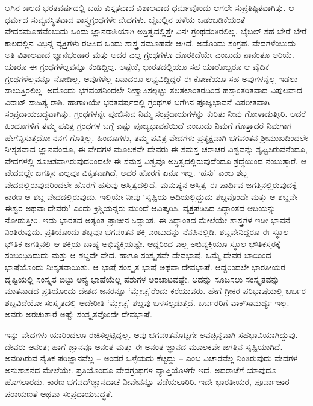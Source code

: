 ಆಗಿನ ಕಾಲದ ಭರತವರ್ಷದಲ್ಲಿ ಬಹು ವಿಸ್ತೃತವಾದ ವಿಶಾಲವಾದ ಧರ್ಮವೊಂದು ಆಗಲೇ ಸುಪ್ರತಿಷ್ಠಿತವಾಗಿತ್ತು. ಆ ಧರ್ಮದ ಸುವ್ಯವಸ್ಥಿತವಾದ ಶಾಸ್ತ್ರಗ್ರಂಥಗಳೇ ವೇದಗಳು. ಬೈಬಲ್ಲಿನ ಹಳೆಯ ಒಡಂಬಡಿಕೆಯಂತೆ ವೇದಸಮೂಹವೆಂಬುದು ಒಂದು ಜ್ಞಾನರಾಶಿಯಾಗಿ ಅಸ್ತಿತ್ವದಲ್ಲಿತ್ತೇ ವಿನಃ ಗ್ರಂಥದಂತಿರಲಿಲ್ಲ. ಬೈಬಲ್ ಸಹ ಬೇರೆ ಬೇರೆ ಕಾಲದಲ್ಲಿನ ವಿಭಿನ್ನ ವ್ಯಕ್ತಿಗಳು ರಚಿಸಿದ ಒಂದು ಶಾಸ್ತ್ರ ಸಮೂಹವೇ ಆಗಿದೆ. ಅದೊಂದು ಸಂಗ್ರಹ. ವೇದಗಳೆಂಬುದು ಅತಿ ವಿಶಾಲವಾದ ಜ್ಞಾನಭಂಡಾರ ಮತ್ತು ಅದರ ಎಲ್ಲ ಗ್ರಂಥಗಳೂ ದೊರಕಿದೆಯೇ ಎಂಬುದು ನಾನಂತೂ ಅರಿಯೆ. ಯಾರೂ ಈ ಗ್ರಂಥಗಳೆಲ್ಲವನ್ನೂ ಕಂಡಿದ್ದಿಲ್ಲ. ಅಷ್ಟೇಕೆ, ಭಾರತದಲ್ಲಿಯೂ ಸಹ ಯಾರೊಬ್ಬರೂ ಆ ವೈದಿಕ ಗ್ರಂಥಗಳೆಲ್ಲವನ್ನೂ ನೋಡಿಲ್ಲ. ಅವುಗಳೆಲ್ಲ ಏನಾದರೂ ಲಭ್ಯವಿದ್ದಿದ್ದರೆ ಈ ಕೋಣೆಯೂ ಸಹ ಅವುಗಳನ್ನೆಲ್ಲ ಇಡಲು ಸಾಲುತ್ತಿರಲಿಲ್ಲ. ಅದೊಂದು ಭಗವಂತನಿಂದಲೇ ನಿಃಶ್ವಾಸಿಸಲ್ಪಟ್ಟು ತಲತಲಾಂತರದಿಂದ ಹಸ್ತಾಂತರಿತವಾದ ವಿಪುಲವಾದ ವಿರಾಟ್ ಸಾಹಿತ್ಯ ರಾಶಿ. ಹಾಗಾಗಿಯೇ ಭರತವರ್ಷದಲ್ಲಿ ಗ್ರಂಥಗಳ ಬಗೆಗಿನ ಪೂಜ್ಯಭಾವನೆ ವಿಪರೀತವಾಗಿ ಸಂಪ್ರದಾಯಬದ್ಧವಾಗಿತ್ತು. ಗ್ರಂಥಗಳನ್ನೇ ಪೂಜಿಸುವ ನಿಮ್ಮ ಸಂಪ್ರದಾಯಗಳನ್ನು ಕುರಿತು ನೀವು ಗೋಳಾಡುತ್ತೀರಿ. ಆದರೆ ಹಿಂದೂಗಳಿಗೆ ತಮ್ಮ ಪವಿತ್ರ ಗ್ರಂಥಗಳ ಬಗ್ಗೆ ಎಷ್ಟು ಪೂಜ್ಯಭಾವನೆಯಿದೆ ಎಂಬುದು ನಿಮಗೆ ಗೊತ್ತಾದರೆ ನಿಮಗಾಗ ಹೇಗೆನ್ನಿಸುತ್ತದೋ ನನಗೆ ಗೊತ್ತಿಲ್ಲ. ಹಿಂದೂಗಳು, ತಮ್ಮ ಪವಿತ್ರ ವೇದಗಳು ಪ್ರತ್ಯಕ್ಷವಾಗಿ ಭಗವಂತನ ಶ‍್ರೀಮುಖದಿಂದಲೇ ನಿಃಸೃತವಾದ ಜ್ಞಾನವೆಂದೂ, ಈ ವೇದಗಳ ಮೂಲಕವೇ ದೇವರು ಈ ಸಮಸ್ತ ಚರಾಚರ ವಿಶ್ವವನ್ನು ಸೃಷ್ಟಿಸಿರುವನೆಂದೂ, ವೇದಗಳಲ್ಲಿ ಸೂಚಿತವಾಗಿರುವುದರಿಂದಲೇ ಈ ಸಮಸ್ತ ವಿಶ್ವವೂ ಅಸ್ತಿತ್ವದಲ್ಲಿರುವುದೆಂದೂ ಶ್ರದ್ಧೆಯಿಂದ ನಂಬುತ್ತಾರೆ. ಆ ವೇದದಲ್ಲೇ ಜಗತ್ತಿನ ಎಲ್ಲವೂ ವಿಕೃತವಾಗಿದೆ, ಅದರ ಹೊರಗೆ ಏನೂ ಇಲ್ಲ. ‘ಹಸು’ ಎಂಬ ಶಬ್ದ ವೇದದಲ್ಲಿರುವುದರಿಂದಲೇ ಹೊರಗೆ ಹಸುವು ಅಸ್ತಿತ್ವದಲ್ಲಿದೆ. ಮನುಷ್ಯನ ಅಸ್ತಿತ್ವ ಈ ಪಾರ್ಥಿವ ಜಗತ್ತಿನಲ್ಲಿರುವುದಕ್ಕೆ ಕಾರಣ ಆ ಶಬ್ದ ವೇದದಲ್ಲಿರುವುದು. ಇಲ್ಲಿಯೇ ನೀವು ‘ಸೃಷ್ಟಿಯ ಆದಿಯಲ್ಲಿದ್ದುದು ಶಬ್ದವೊಂದೇ ಮತ್ತು ಆ ಶಬ್ದವೇ ಈಶ್ವರ ಅಥವಾ ದೇವರು’ ಎಂದು ಕ್ರಿಶ್ಚಿಯನ್ನರು ಮುಂದೆ ಆವಿಷ್ಕರಿಸಿ, ವ್ಯಕ್ತಪಡಿಸಿದ ಸಿದ್ಧಾಂತದ ಆದಿಯನ್ನು ನೋಡುತ್ತೀರಿ. ಇದು ಭಾರತದ ಅತ್ಯಂತ ಪ್ರಾಚೀನ ಸಿದ್ಧಾಂತ. ಈ ಸಿದ್ಧಾಂತದ ಮೇಲೆಯೇ ಶಾಸ್ತ್ರಗಳ ಇಡೀ ಭಾವನೆ ನಿಂತಿರುವುದು. ಪ್ರತಿಯೊಂದು ಶಬ್ದವೂ ಭಗವಂತನ ಶಕ್ತಿ ಎಂಬುದನ್ನು ನೆನಪಿನಲ್ಲಿಡಿ. ಶಬ್ದವೇನಿದ್ದರೂ ಈ ಸ್ಥೂಲ ಭೌತಿಕ ಜಗತ್ತಿನಲ್ಲಿ ಆ ಶಕ್ತಿಯ ಬಾಹ್ಯ ಅಭಿವ್ಯಕ್ತಿಯಷ್ಟೇ. ಆದ್ದರಿಂದ ಎಲ್ಲ ಅಭಿವ್ಯಕ್ತಿಯೂ ಸ್ಥೂಲ ಭೌತಿಕಸ್ತರಕ್ಕೆ ಸಂಬಂಧಿಸಿದುದು ಮತ್ತು ಆ ಶಬ್ದವೇ ವೇದ. ಹಾಗೂ ಸಂಸ್ಕೃತವೇ ದೇವಭಾಷೆ. ಒಮ್ಮೆ ದೇವರ ಬಾಯಿಂದ ಭಾಷೆಯೊಂದು ನಿಃಸೃತವಾಯಿತು. ಆ ಭಾಷೆ ಸಂಸ್ಕೃತ ಭಾಷೆ ಅಥವಾ ದೇವಭಾಷೆ. ಆದ್ದರಿಂದಲೇ ಭಾರತೀಯರ ದೃಷ್ಟಿಯಲ್ಲಿ ಸಂಸ್ಕೃತ ಬಿಟ್ಟು ಅನ್ಯ ಭಾಷೆಯೆಲ್ಲ ಪಶುಗಳ ಅರಚಾಟವಷ್ಟೇ. ಅದನ್ನು ಸೂಚಿಸಲು ಸಂಸ್ಕೃತವನ್ನು ಮಾತನಾಡದ ಪ್ರತಿಯೊಂದು ದೇಶದ ಜನರನ್ನೂ ‘ಮ್ಲೇಚ್ಛ’ರೆಂದು ಕರೆಯುವರು. ಹೇಗೆ ಗ್ರೀಕರ ಪರಿಭಾಷೆಯಲ್ಲಿ ಬರ್ಬರ ಶಬ್ದವಿದೆಯೋ ಸಂಸ್ಕೃತದಲ್ಲಿ ಅದೇರೀತಿ ‘ಮ್ಲೇಚ್ಛ’ ಶಬ್ದವು ಬಳಸಲ್ಪಡುತ್ತದೆ. ಬರ್ಬರರಿಗೆ ವಾಕ್‌ಸಾಮರ್ಥ್ಯ ಇಲ್ಲ. ಅವರು ಅರಚುತ್ತಾರೆ ಅಷ್ಟೆ; ಸಂಸ್ಕೃತವೊಂದೇ ದೇವಭಾಷೆ.

ಇನ್ನು ವೇದಗಳು ಯಾರಿಂದಲೂ ರಚಿಸಲ್ಪಟ್ಟಿದ್ದಲ್ಲ. ಅವು ಭಗವಂತನೊಟ್ಟಿಗೇ ಅವಚ್ಛಿನ್ನವಾಗಿ ಸಹಭಾವಿಯಾಗಿದ್ದುವು. ದೇವರು ಅನಂತ; ಹಾಗೆ ಜ್ಞಾನವೂ ಅನಂತ ಮತ್ತು ಈ ಅನಂತ ಜ್ಞಾನದ ಮೂಲಕವೇ ಜಗತ್ತಿನ ಸೃಷ್ಟಿಯಾಗಿದೆ. ಅವರಿಗಿರುವ ನೈತಿಕ ಪರಿಜ್ಞಾನವೆಲ್ಲ – ಅಂದರೆ ಒಳ್ಳೆಯದು ಕೆಟ್ಟದ್ದು – ಎಂಬ ವಿಚಾರವೆಲ್ಲ ನಿಂತಿರುವುದು ವೇದಗಳ ಅನುಶಾಸನದ ಮೇಲೆಯೇ. ಪ್ರತಿಯೊಂದೂ ವೇದಗ್ರಂಥಗಳ ವ್ಯಾಪ್ತಿಯೊಳಗೇ ಇದೆ. ಅದರಾಚೆಗೆ ಯಾವುದೂ ಹೊಗಲಾರದು. ಕಾರಣ ಭಗವದ್‌ಜ್ಞಾನದಾಚೆ ನೀವೇನನ್ನೂ ಪಡೆಯಲಾರಿರಿ. ಇದೇ ಭಾರತೀಯರ, ಪೂರ್ವಾಚಾರ ಪರಾಯಣತೆ ಅಥವಾ ಸಂಪ್ರದಾಯಬದ್ಧತೆ.

